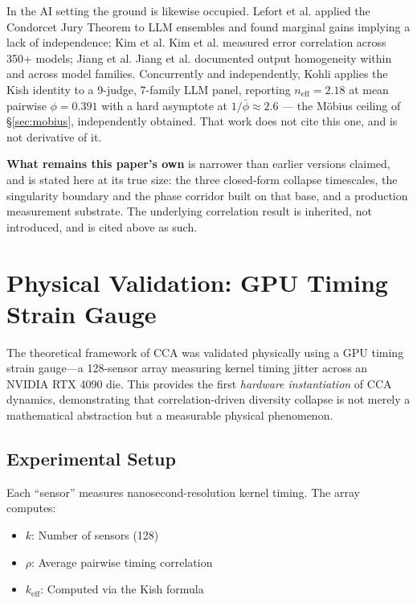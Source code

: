 \documentclass[11pt,a4paper]{article}
\theoremstyle{definition}
\theoremstyle{remark}
\newcommand{\keff}{k_{\text{eff}}}
\begin{document}
In the AI setting the ground is likewise occupied. Lefort et al. \cite{lefort2024} applied the Condorcet
Jury Theorem to LLM ensembles and found marginal gains implying a lack of independence;
Kim et al. Kim et al. \cite{kim2025} measured error correlation across 350+ models; Jiang et al. Jiang et al. \cite{jiang2025} documented
output homogeneity within and across model families. Concurrently and independently,
Kohli \cite{kohli2026} applies the Kish identity to a 9-judge, 7-family LLM panel, reporting
$n_{\text{eff}} = 2.18$ at mean pairwise $\phi = 0.391$ with a hard asymptote at
$1/\bar{\phi} \approx 2.6$ --- the M\"obius ceiling of \S\ref{sec:mobius}, independently
obtained. That work does not cite this one, and is not derivative of it.

\textbf{What remains this paper's own} is narrower than earlier versions claimed, and is stated
here at its true size: the three closed-form collapse timescales, the singularity boundary and
the phase corridor built on that base, and a production measurement substrate. The underlying
correlation result is inherited, not introduced, and is cited above as such.

\section{Physical Validation: GPU Timing Strain Gauge}
\label{sec:gpu-validation}

The theoretical framework of CCA was validated physically using a GPU timing strain gauge---a 128-sensor array measuring kernel timing jitter across an NVIDIA RTX 4090 die. This provides the first \textit{hardware instantiation} of CCA dynamics, demonstrating that correlation-driven diversity collapse is not merely a mathematical abstraction but a measurable physical phenomenon.

\subsection{Experimental Setup}

Each ``sensor'' measures nanosecond-resolution kernel timing. The array computes:
\begin{itemize}[noitemsep]
    \item $k$: Number of sensors (128)
    \item $\rho$: Average pairwise timing correlation
    \item $\keff$: Computed via the Kish formula
\end{itemize}
\end{document}
